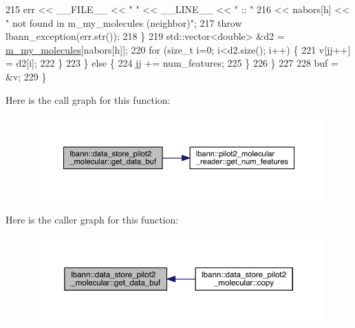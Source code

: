 \begin{DoxyCode}
215         err << \_\_FILE\_\_ << \textcolor{stringliteral}{" "} << \_\_LINE\_\_ << \textcolor{stringliteral}{" :: "}
216             << nabors[h] << \textcolor{stringliteral}{" not found in m\_my\_molecules (neighbor)"};
217         \textcolor{keywordflow}{throw} lbann\_exception(err.str());
218       \}
219       std::vector<double> &d2 = \hyperlink{classlbann_1_1data__store__pilot2__molecular_a67fb9174cecff931f61e7f6ca000315b}{m\_my\_molecules}[nabors[h]];
220       \textcolor{keywordflow}{for} (\textcolor{keywordtype}{size\_t} i=0; i<d2.size(); i++) \{
221         v[jj++] = d2[i];
222       \}
223     \} \textcolor{keywordflow}{else} \{
224       jj += num\_features;
225     \}
226   \}
227 
228   buf = &v;
229 \}
\end{DoxyCode}
Here is the call graph for this function\+:\nopagebreak
\begin{figure}[H]
\begin{center}
\leavevmode
\includegraphics[width=350pt]{classlbann_1_1data__store__pilot2__molecular_ab0f82fb7fdec7779bbb693e06a206127_cgraph}
\end{center}
\end{figure}
Here is the caller graph for this function\+:\nopagebreak
\begin{figure}[H]
\begin{center}
\leavevmode
\includegraphics[width=350pt]{classlbann_1_1data__store__pilot2__molecular_ab0f82fb7fdec7779bbb693e06a206127_icgraph}
\end{center}
\end{figure}
\mbox{\label{classlbann_1_1data__store__pilot2__molecular_a7eadb63f1c879c62b587a7b5d972d4e4}} 
